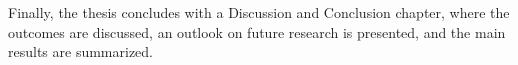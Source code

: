Finally, the thesis concludes with a Discussion and Conclusion chapter, where the outcomes are discussed, an outlook on future research is presented, and the main results are summarized.







